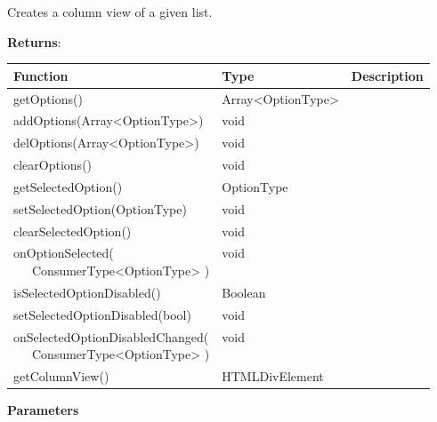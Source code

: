 \vspace*{6pt}
Creates a column view of a given list. 

\vspace*{18pt}
\noindent
\textbf{Returns}: 

\begin{table}[!htb] 
    \label{api:columnOptionsComponentReturn}
    \footnotesize
    \setlength\extrarowheight{4pt}
    \begin{tabular}{ p{5cm} p{3cm} p{5cm} }
        \toprule[1.2pt]
        \textbf{Function}                   & \textbf{Type}     & \textbf{Description} \\
        \midrule
        getOptions()                        & Array<OptionType> &  \\
        addOptions(Array<OptionType>)       & void              &  \\
        delOptions(Array<OptionType>)       & void              &  \\
        clearOptions()                      & void              &  \\
        getSelectedOption()                 & OptionType        &  \\
        setSelectedOption(OptionType)       & void              &  \\
        clearSelectedOption()               & void              &  \\
        \tbbr{
            onOptionSelected( \\
                \ \ \ ConsumerType<OptionType>
            )}                              & void              &  \\
        isSelectedOptionDisabled()          & Boolean           &  \\
        setSelectedOptionDisabled(bool)     & void              &  \\
        \tbbr{
            onSelectedOptionDisabledChanged( \\
                \ \ \ ConsumerType<OptionType>
            )}                              & void              &  \\
        getColumnView()                     & HTMLDivElement    &  \\
        \bottomrule[1.2pt]
    \end{tabular}
\end{table}

\vspace*{6pt}
\noindent
\textbf{Parameters}


